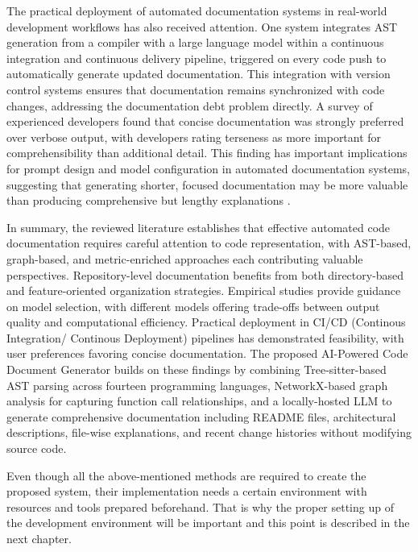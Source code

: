The practical deployment of automated documentation systems in real-world development workflows has also received attention. One system integrates AST generation from a compiler with a large language model within a continuous integration and continuous delivery pipeline, triggered on every code push to automatically generate updated documentation. This integration with version control systems ensures that documentation remains synchronized with code changes, addressing the documentation debt problem directly. A survey of experienced developers found that concise documentation was strongly preferred over verbose output, with developers rating terseness as more important for comprehensibility than additional detail. This finding has important implications for prompt design and model configuration in automated documentation systems, suggesting that generating shorter, focused documentation may be more valuable than producing comprehensive but lengthy explanations \cite{Procko2023}.

In summary, the reviewed literature establishes that effective automated code documentation requires careful attention to code representation, with AST-based, graph-based, and metric-enriched approaches each contributing valuable perspectives. Repository-level documentation benefits from both directory-based and feature-oriented organization strategies. Empirical studies provide guidance on model selection, with different models offering trade-offs between output quality and computational efficiency. Practical deployment in CI/CD (Continous Integration/ Continous Deployment) pipelines has demonstrated feasibility, with user preferences favoring concise documentation. The proposed AI-Powered Code Document Generator builds on these findings by combining Tree-sitter-based AST parsing across fourteen programming languages, NetworkX-based graph analysis for capturing function call relationships, and a locally-hosted LLM to generate comprehensive documentation including README files, architectural descriptions, file-wise explanations, and recent change histories without modifying source code.
\par Even though all the above-mentioned methods are required to create the proposed system, their implementation needs a certain environment with resources and tools prepared beforehand. That is why the proper setting up of the development environment will be important and this point is described in the next chapter.